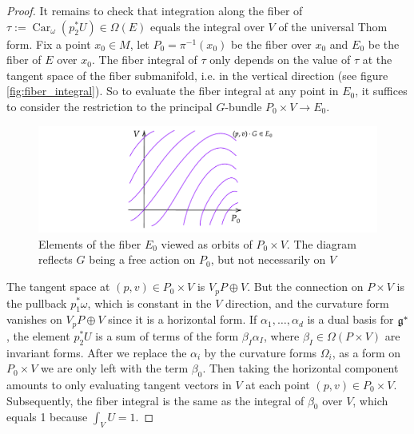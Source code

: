 \begin{proof}
	It remains to check that integration along the fiber of
	$\tau:=\operatorname{Car}_{\omega}(p_2^*U)\in\Omega(E)$ equals the integral
	over  $V$ of the universal Thom form.
	Fix a point $x_0\in M$, let $P_0=\pi^{-1}(x_0)$ be the fiber over $x_0$
	and $E_0$ be the fiber of $E$ over  $x_0$. 
	The fiber integral of $\tau$ only depends on the value of $\tau$ at the
	tangent space of the fiber submanifold, i.e. in the vertical direction (see
	figure \ref{fig:fiber_integral}). 
	So to evaluate the fiber integral at any point in $E_0$, it suffices to 
	consider the restriction to the principal $G$-bundle 
	$P_0\times V \to E_0$.
	\begin{figure}[htb]
	    \hfill
		\begin{minipage}[c]{0.5\textwidth}
			\includegraphics[trim={47mm 4mm 51mm 0},clip,width=\textwidth]{figs/associated_fiber_integral.pdf}
		\end{minipage} 
		\begin{minipage}[c]{0.48\textwidth}
	        \caption{Elements of the fiber $E_0$ viewed as orbits of $P_0\times
			V$. The diagram reflects $G$ being a free action on  $P_0$, but not
			necessarily on $V$}
	        \label{fig:associated_fiber_integral}
		\end{minipage} 
	\end{figure}
	The tangent space at $(p,v)\in P_0\times V$ 
	is $V_pP \oplus V$. But the connection on $P\times V$ is the pullback 
	$p_1^*\omega$, which is constant in the $V$ direction, and the curvature
	form vanishes on  $V_pP\oplus V$ since it is a horizontal form. 
	If $\alpha_1,\ldots,\alpha_d$ is a dual basis for
	$\operatorname{\mathfrak{g}}^*$, the element $p_2^*U$ is a sum of terms of the form 
	$\beta_I \alpha_I$, where  $\beta_I \in \Omega(P\times V)$ are invariant
	forms. 
	After we replace the $\alpha_i$ by the curvature forms  $\Omega_i$, as a
	form on $P_0\times V$ we are only left with the term $\beta_0$. 
	Then taking the horizontal component amounts to only evaluating tangent
	vectors in $V$ at each point $(p,v)\in P_0\times V$. 
	Subsequently, the fiber integral is the same as the integral of 
	$\beta_0$ over $V$, which equals 1 because $\int_V U = 1$.  

\end{proof}
